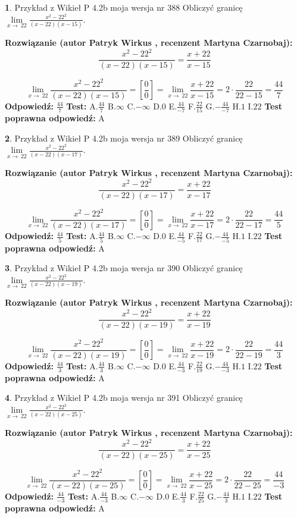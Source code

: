 \documentclass[12pt, a4paper]{article}
\theoremstyle{definition} %
\newtheorem{zad}{}
\newcommand{\zadStart}[1]{\begin{zad}#1\newline}
\newcommand{\zadStop}{\end{zad}}
\newcommand{\rozwStart}[2]{\noindent \textbf{Rozwiązanie (autor #1 , recenzent #2): }\newline}
\newcommand{\rozwStop}{\newline}
\newcommand{\odpStart}{\noindent \textbf{Odpowiedź:}\newline}
\newcommand{\odpStop}{\newline}
\newcommand{\testStart}{\noindent \textbf{Test:}\newline}
\newcommand{\testStop}{\newline}
\newcommand{\kluczStart}{\noindent \textbf{Test poprawna odpowiedź:}\newline}
\newcommand{\kluczStop}{\newline}
\begin{document}
\zadStart{Przykład z Wikieł P 4.2b moja wersja nr 388}
Obliczyć granicę $\lim\limits_{x\to\ 22}\frac{x^{2}-22^{2}}{(x-22)(x-15)}$.
\zadStop
\rozwStart{Patryk Wirkus}{Martyna Czarnobaj}
$$\frac{x^{2}-22^{2}}{(x-22)(x-15)}=\frac{x+22}{x-15}$$

$$\lim\limits_{x\to\ 22}\frac{x^{2}-22^{2}}{(x-22)(x-15)}=[\frac{0}{0}]=\lim\limits_{x\to\ 22}\frac{x+22}{x-15}=2 \cdot \frac{22}{22-15} = \frac{44}{7}$$
\rozwStop
\odpStart
$\frac{44}{7}$
\odpStop
\testStart
A.$\frac{44}{7}$
B.$\infty$
C.$-\infty$
D.$0$
E.$\frac{44}{-7}$
F.$\frac{22}{15}$
G.$-\frac{44}{-7}$
H.$1$
I.$22$
\testStop
\kluczStart
A
\kluczStop



\zadStart{Przykład z Wikieł P 4.2b moja wersja nr 389}
Obliczyć granicę $\lim\limits_{x\to\ 22}\frac{x^{2}-22^{2}}{(x-22)(x-17)}$.
\zadStop
\rozwStart{Patryk Wirkus}{Martyna Czarnobaj}
$$\frac{x^{2}-22^{2}}{(x-22)(x-17)}=\frac{x+22}{x-17}$$

$$\lim\limits_{x\to\ 22}\frac{x^{2}-22^{2}}{(x-22)(x-17)}=[\frac{0}{0}]=\lim\limits_{x\to\ 22}\frac{x+22}{x-17}=2 \cdot \frac{22}{22-17} = \frac{44}{5}$$
\rozwStop
\odpStart
$\frac{44}{5}$
\odpStop
\testStart
A.$\frac{44}{5}$
B.$\infty$
C.$-\infty$
D.$0$
E.$\frac{44}{-5}$
F.$\frac{22}{17}$
G.$-\frac{44}{-5}$
H.$1$
I.$22$
\testStop
\kluczStart
A
\kluczStop



\zadStart{Przykład z Wikieł P 4.2b moja wersja nr 390}
Obliczyć granicę $\lim\limits_{x\to\ 22}\frac{x^{2}-22^{2}}{(x-22)(x-19)}$.
\zadStop
\rozwStart{Patryk Wirkus}{Martyna Czarnobaj}
$$\frac{x^{2}-22^{2}}{(x-22)(x-19)}=\frac{x+22}{x-19}$$

$$\lim\limits_{x\to\ 22}\frac{x^{2}-22^{2}}{(x-22)(x-19)}=[\frac{0}{0}]=\lim\limits_{x\to\ 22}\frac{x+22}{x-19}=2 \cdot \frac{22}{22-19} = \frac{44}{3}$$
\rozwStop
\odpStart
$\frac{44}{3}$
\odpStop
\testStart
A.$\frac{44}{3}$
B.$\infty$
C.$-\infty$
D.$0$
E.$\frac{44}{-3}$
F.$\frac{22}{19}$
G.$-\frac{44}{-3}$
H.$1$
I.$22$
\testStop
\kluczStart
A
\kluczStop



\zadStart{Przykład z Wikieł P 4.2b moja wersja nr 391}
Obliczyć granicę $\lim\limits_{x\to\ 22}\frac{x^{2}-22^{2}}{(x-22)(x-25)}$.
\zadStop
\rozwStart{Patryk Wirkus}{Martyna Czarnobaj}
$$\frac{x^{2}-22^{2}}{(x-22)(x-25)}=\frac{x+22}{x-25}$$

$$\lim\limits_{x\to\ 22}\frac{x^{2}-22^{2}}{(x-22)(x-25)}=[\frac{0}{0}]=\lim\limits_{x\to\ 22}\frac{x+22}{x-25}=2 \cdot \frac{22}{22-25} = \frac{44}{-3}$$
\rozwStop
\odpStart
$\frac{44}{-3}$
\odpStop
\testStart
A.$\frac{44}{-3}$
B.$\infty$
C.$-\infty$
D.$0$
E.$\frac{44}{3}$
F.$\frac{22}{25}$
G.$-\frac{44}{3}$
H.$1$
I.$22$
\testStop
\kluczStart
A
\kluczStop
\end{document}
